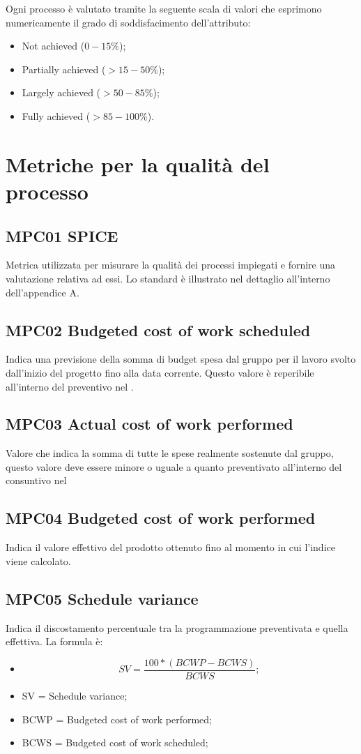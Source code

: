 Ogni processo è valutato tramite la seguente scala di valori che esprimono numericamente il grado di soddisfacimento dell’attributo:
\begin{itemize}
  \item Not achieved (\(0-15\%\));
  \item Partially achieved (\(>15-50\%\));
  \item Largely achieved (\(>50-85\%\));
  \item Fully achieved (\(>85-100\%\)). 
\end{itemize}

\pagebreak

\section{Metriche per la qualità del processo}
\subsection{MPC01 SPICE}
Metrica utilizzata per misurare la qualità dei processi impiegati e fornire una valutazione relativa ad essi. Lo standard è illustrato nel dettaglio all’interno dell'appendice A.

\subsection{MPC02 Budgeted cost of work scheduled}
Indica una previsione della somma di budget spesa dal gruppo per il lavoro svolto dall'inizio del progetto fino alla data corrente. Questo valore è reperibile all'interno del preventivo nel \PdP.

\subsection{MPC03 Actual cost of work performed}
Valore che indica la somma di tutte le spese realmente sostenute dal gruppo, questo valore deve essere minore o uguale a quanto preventivato all'interno del consuntivo nel \PdP

\subsection{MPC04 Budgeted cost of work performed}
Indica il valore effettivo del prodotto ottenuto fino al momento in cui l'indice viene calcolato.

\subsection{MPC05 Schedule variance}
Indica il discostamento percentuale tra la programmazione preventivata e quella effettiva.
La formula è:
\begin{itemize}
  \item[] \[SV =  \frac{100 * (BCWP - BCWS)}{BCWS};\]
  \item SV = Schedule variance;
  \item BCWP = Budgeted cost of work performed;
  \item BCWS = Budgeted cost of work scheduled;
\end{itemize}

